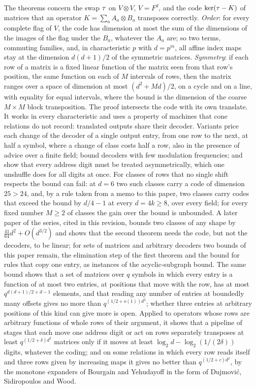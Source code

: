 The theorems concern the swap $\tau$ on $V\otimes V$, $V=F^d$, and the code $\ker(\tau-K)$ of matrices that an operator
$K=\sum_aA_a\otimes B_a$ transposes correctly. \emph{Order}: for every complete flag of $V$, the code has dimension at most
the sum of the dimensions of the images of the flag under the $B_a$, whatever the $A_a$ are; so two terms, commuting
families, and, in characteristic $p$ with $d=p^m$, all affine index maps stay at the dimension $d(d+1)/2$ of the
symmetric matrices. \emph{Symmetry}: if each row of a matrix is a fixed linear function of the matrix seen from that
row's position, the same function on each of $M$ intervals of rows, then the matrix ranges over a space of dimension at
most $(d^2+Md)/2$, on a cycle and on a line, with equality for equal intervals, where the bound is the dimension of the
coarse $M\times M$ block transposition. The proof intersects the code with its own translate. It works in every
characteristic and uses a property of machines that cone relations do not record: translated outputs share their
decoder. Variants price each change of the decoder of a single output entry, from one row to the next, at half a
symbol, where a change of class costs half a row, also in the presence of advice over a finite field; bound decoders
with few modulation frequencies; and show that every address digit must be treated asymmetrically, which one unshuffle
does for all digits at once. For classes of rows that no single shift respects the bound
can fail: at $d=6$ two such classes carry a code of dimension $25>24$, and, by a rule taken from a memo to this paper,
two classes carry codes that exceed the bound by $d/4-1$ at every $d=4k\ge8$, over every field; for every fixed number
$M\ge2$ of classes the gain over the bound is unbounded. A later paper of the series, cited in this revision, bounds
two classes of any shape by $\tfrac{41}{64}d^2+O(d^{3/2})$ and shows that the second theorem needs the code, but not
the decoders, to be linear; for sets of matrices and arbitrary decoders two bounds of this paper remain, the
elimination step of the first theorem and the bound for rules that copy one entry, as instances of the
acyclic-subgraph bound. The same bound shows that a set of matrices over $q$ symbols in which every entry is a
function of at most two entries, at positions that move with the row, has at most $q^{d(d+1)/2+d-1}$ elements, and
that reading any number of entries at boundedly many offsets gives no more than $q^{(1/2+o(1))d^2}$; whether three
entries at arbitrary positions of this kind can give more is open. Applied to operators whose rows are arbitrary
functions of whole rows of their argument, it shows that a pipeline of stages that each move one address digit or
act on rows separately transposes at least $q^{(1/2+\delta)d^2}$ matrices only if it moves at least
$\log_2d-\log_2(1/(2\delta))$ digits, whatever the coding; and on some relations in which every row reads itself and
three rows given by increasing maps it gives no better than $q^{(1/2+c)d^2}$, by the monotone expanders of Bourgain
and Yehudayoff in the form of Dujmovi\'c, Sidiropoulos and Wood.

